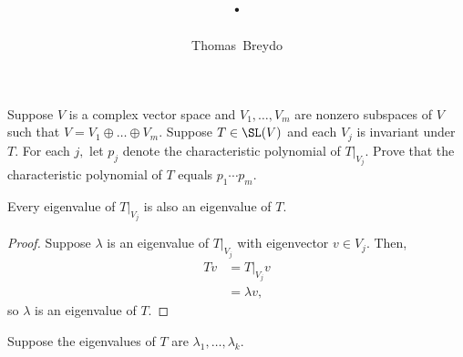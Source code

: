 \documentclass{amsart}
\title{\pagenum.\probnum}
\author{Thomas\ Breydo}
\newcommand{\restrict}[2]{\left.#1\right|_{#2}}
\begin{document}
\maketitle

\begin{problem*}
Suppose $V$ is a complex vector space and $V_1,\dots,V_m$ are
nonzero subspaces of $V$ such that $V=V_1\oplus\dots\oplus V_m.$
Suppose $T\in\SL(V)$ and each $V_j$ is invariant under $T.$
For each $j,$ let $p_j$ denote the characteristic polynomial
of $\restrict{T}{V_j}.$ Prove that the characteristic
polynomial of $T$ equals $p_1\cdots p_m.$
\end{problem*}

\vspace{0.5in}

\begin{claim*}
Every eigenvalue of $\restrict{T}{V_j}$ is also an eigenvalue
of $T.$
\end{claim*}
\begin{proof}
Suppose $\lambda$ is an eigenvalue of $\restrict{T}{V_j}$ with
eigenvector $v\in V_j.$ Then,
\begin{align*}
    Tv
    &= \restrict{T}{V_j}v \\
    &= \lambda v,
\end{align*}
so $\lambda$ is an eigenvalue of $T.$
\end{proof}

\vspace{\baselineskip}

Suppose the eigenvalues of $T$ are $\lambda_1,\dots,\lambda_k.$
\end{document}
